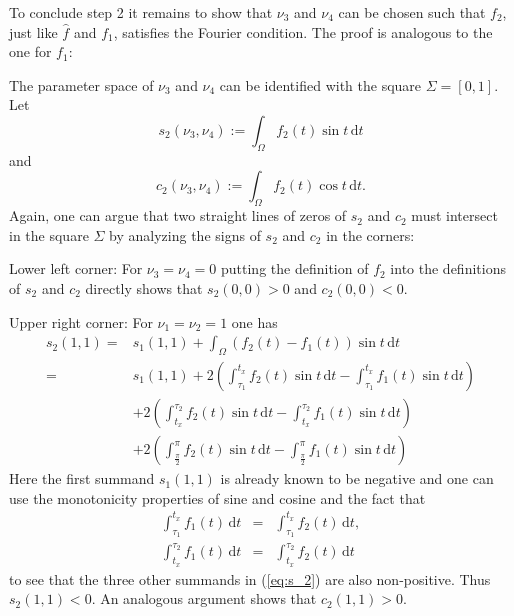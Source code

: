 \documentclass{article}
\newcommand{\dt}{\,\mathrm{d}t}
\begin{document}
To conclude step 2 it remains to show that $\nu_3$ and $\nu_4$ can be chosen such that $f_2$, just like $\hat f$ and $f_1$, satisfies the Fourier condition. The proof is analogous to the one for $f_1$:

The parameter space of $\nu_3$ and $\nu_4$ can be identified with the square $\Sigma=[0,1]$. Let
\begin{equation*}
    s_2(\nu_3, \nu_4) := \int_\Omega f_2(t) \sin t \dt 
\end{equation*}
and
\begin{equation*}
    c_2(\nu_3, \nu_4) := \int_\Omega f_2(t) \cos t \dt.
\end{equation*}
Again, one can argue that two straight lines of zeros of $s_2$ and $c_2$ must intersect in the square $\Sigma$ by analyzing the signs of $s_2$ and $c_2$ in the corners:

Lower left corner: For $\nu_3 = \nu_4 = 0$ putting the definition of $f_2$ into the definitions of $s_2$ and $c_2$ directly shows that $s_2(0,0) > 0$ and $c_2(0,0) < 0$. %

Upper right corner: For $\nu_1 = \nu_2 = 1$ one has
\begin{equation} \label{eq:s_2}
    \begin{split}
    s_2(1,1) =& s_1(1,1) + \int_\Omega \left(f_2(t)-f_1(t)\right) \sin t \dt \\
    =& s_1(1,1) + 2\left(\int_{\tau_1}^{t_x} f_2(t) \sin t \dt - \int_{\tau_1}^{t_x} f_1(t) \sin t \dt\right) \\
    &+ 2\left(\int_{t_x}^{\tau_2} f_2(t) \sin t \dt - \int_{t_x}^{\tau_2} f_1(t) \sin t \dt\right) \\
    &+ 2\left(\int_{\frac\pi 2}^\pi f_2(t) \sin t \dt - \int_{\frac\pi 2}^\pi f_1(t) \sin t \dt\right)
    \end{split}
\end{equation}
Here the first summand $s_1(1,1)$ is already known to be negative and one can use the monotonicity properties of sine and cosine and the fact that
\begin{eqnarray*}
    \int_{\tau_1}^{t_x} f_1(t) \dt &=& \int_{\tau_1}^{t_x} f_2(t) \dt,\\
    \int_{t_x}^{\tau_2} f_1(t) \dt &=& \int_{t_x}^{\tau_2} f_2(t) \dt
\end{eqnarray*}
to see that the three other summands in (\ref{eq:s_2}) are also non-positive. Thus $s_2(1,1) < 0$.
An analogous argument shows that $c_2(1,1) > 0$.
\end{document}
